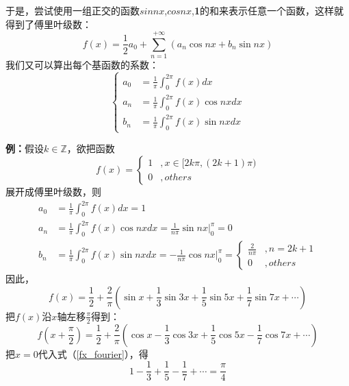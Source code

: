 	于是，尝试使用一组正交的函数$sin nx$,$cos nx$,\textbf{1}的和来表示任意一个函数，这样就得到了傅里叶级数：
	\begin{equation}
	\label{Fourier_series}
		f(x) = \frac{1}{2}a_0+\sum_{n=1}^{+\infty}(a_n\cos nx + b_n\sin nx)
	\end{equation}
	我们又可以算出每个基函数的系数：
	\begin{equation}
	\label{Fourier_coef}
	\begin{cases}
		a_0&=\frac{1}{\pi}\int_{0}^{2\pi}f(x)dx	\\
		a_n&=\frac{1}{\pi}\int_{0}^{2\pi}f(x)\cos nxdx	\\
		b_n&=\frac{1}{\pi}\int_{0}^{2\pi}f(x)\sin nxdx
	\end{cases}
	\end{equation}
	
	\noindent\textbf{例：}假设$k\in \mathbb{Z}$，欲把函数
	\begin{equation*}
		f(x)=
		\begin{cases}
		1&, x\in [2k\pi,(2k+1)\pi)	\\
		0&, others
	\end{cases}
	\end{equation*}
	展开成傅里叶级数，则
	\begin{equation*}
	\begin{aligned}
		a_0 
		&= \frac{1}{\pi}\int_0^{2\pi}f(x)dx=1	\\
		a_n 
		&= \frac{1}{\pi}\int_0^{2\pi}f(x)\cos nxdx	= \frac{1}{n\pi}\sin nx|_0^{\pi}	= 0	\\
		b_n 
		&= \frac{1}{\pi}\int_0^{2\pi}f(x)\sin nxdx = -\frac{1}{n\pi}\cos nx|_0^{\pi}=
		\begin{cases}
		\frac{2}{n\pi} &,n=2k+1	\\
		0 &,others
	\end{cases}
	\end{aligned}
	\end{equation*}
	因此，
	\begin{equation*}
		f(x)=\frac{1}{2}+\frac{2}{\pi}(\sin x + \frac{1}{3}\sin 3x + \frac{1}{5}\sin 5x + \frac{1}{7}\sin 7x + \cdots)
	\end{equation*}
	把$f(x)$沿$x$轴左移$\frac{\pi}{2}$得到：
	\begin{equation}
		\label{fx_fourier}
		f(x+\frac{\pi}{2})=\frac{1}{2}+\frac{2}{\pi}(\cos x - \frac{1}{3}\cos 3x + \frac{1}{5}\cos 5x - \frac{1}{7}\cos 7x + \cdots)
	\end{equation}
	把$x=0$代入式（\ref{fx_fourier}），得
	$$
	1-\frac{1}{3}+\frac{1}{5}-\frac{1}{7}+\cdots=\frac{\pi}{4}
	$$
	
